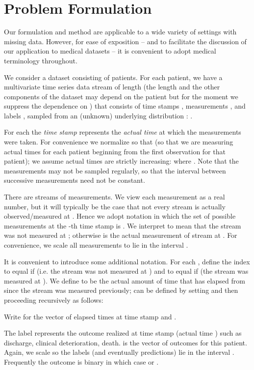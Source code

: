 \documentclass{article}
\begin{document}
	
	\section{Problem Formulation}\label{sect:model}
	Our formulation and method are applicable to a wide variety of settings with missing data.  However, for ease of exposition -- and to facilitate the discussion of our application to medical datasets -- it is convenient to adopt medical terminology throughout.
	
	We consider a dataset consisting of   patients. For each patient, we have a multivariate time series data stream of length  (the length  and the other components of the dataset may depend on the patient  but for the moment we suppress the dependence on ) that consists of time stamps , measurements , and labels , sampled from an (unknown) underlying distribution :  . 
	
	For each  the {\em time stamp}  represents the {\em actual time} at which the measurements  were taken. For convenience we normalize so that  (so that we are measuring actual times for each patient beginning from the first observation for that patient); we assume actual times are strictly increasing:  where . Note that the measurements may not be sampled regularly, so that the interval   between successive measurements need not be constant. 
	
	There are  streams of measurements.  We view each measurement as a real number, but it will typically be the case that not every stream is actually observed/measured at .  Hence we adopt notation in which the set of possible measurements at the -th time stamp  is .  We interpret   to mean that the stream  was not measured at  ; otherwise  is the actual measurement of stream  at  . For convenience, we scale all measurements to lie in the interval .
	
	It is convenient to introduce some additional notation.  For each , define the index  to equal  if  (i.e. the stream  was not measured at ) and to equal  if  (the stream  was measured at ).  We define  
	 to be the actual amount of time that has elapsed from  since the stream  was measured previously;  can be  defined by setting  and then proceeding recursively as follows: 
	
	Write  for the vector of elapsed times at time stamp  and .
	
	The label  represents the outcome realized at time stamp  (actual time ) such as discharge, clinical deterioration, death.  is the vector of outcomes for this patient. Again, we scale so the labels (and eventually predictions) lie in the interval .  Frequently the outcome is binary in which case  or .
	
\end{document}
